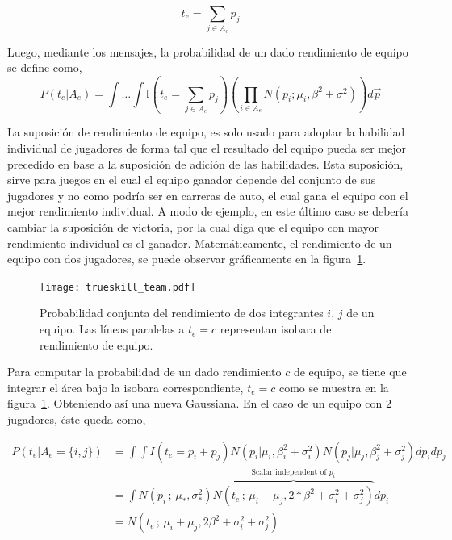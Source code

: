 \documentclass[11pt,twoside, spanish]{report} %
\begin{document}
\begin{equation}
t_e = \sum_{j\in A_e } p_j
\end{equation}

Luego, mediante los mensajes, la probabilidad de un dado rendimiento de equipo se define como,
\begin{equation}
P(t_e|A_e) = \int \dots \int \mathbb{I}(t_e = \sum_{j\in A_e } p_j ) \left(\prod_{i \in A_e} N(p_i;\mu_i,\beta^2 + \sigma^2) \right) d\vec{p}
\end{equation}

La suposici\'on de rendimiento de equipo, es solo usado para adoptar la habilidad individual de jugadores de forma tal que el resultado del equipo pueda ser mejor precedido en base a la suposici\'on de adici\'on de las habilidades.
Esta suposici\'on, sirve para juegos en el cual el equipo ganador depende del conjunto de sus jugadores y no como podr\'ia ser en carreras de auto, el cual gana el equipo con el mejor rendimiento individual.
A modo de ejemplo, en este \'ultimo caso se deber\'ia cambiar la suposici\'on de victoria, por la cual diga que el equipo con mayor rendimiento individual es el ganador.
Matem\'aticamente, el rendimiento de un equipo con dos jugadores, se puede observar gr\'aficamente en la figura~\ref{fig:fig9}.

\begin{figure}[H]
	\centering
	\texttt{[image: trueskill\_team.pdf]}
	\caption{Probabilidad conjunta del rendimiento de dos integrantes $i$, $j$ de un equipo. Las l\'ineas paralelas a $t_e=c$ representan isobara de rendimiento de equipo.}
	\label{fig:fig9}
\end{figure}

Para computar la probabilidad de un dado rendimiento $c$ de equipo, se tiene que integrar el \'area bajo la isobara correspondiente, $ t_e = c $ como se muestra en la figura~\ref{fig:fig9}.
Obteniendo as\'i una nueva Gaussiana.
En el caso de un equipo con $2$ jugadores, \'este queda como,


\begin{equation}
\begin{split}
P(t_e|A_e=\{i,j\}) & =\int\int I(t_e=p_i+p_j)N(p_i \vert \mu_i,\beta_i^2+\sigma_i^2)N(p_j \vert \mu_j,\beta_j^2+\sigma_j^2)dp_idp_j\\
  & = \int N(p_i\,;\,\mu_{*},\sigma_{*}^2) \overbrace{N(t_e\,;\,\mu_i+\mu_j,2*\beta^2 + \sigma_i^2 + \sigma_j^2)}^{\text{Scalar independent of $p_i$}} dp_i \\[0.3cm]
& = N(t_e \,;\, \mu_i+\mu_j,2\beta^2 + \sigma_i^2 + \sigma_j^2)
\end{split}
\end{equation}
\end{document}

